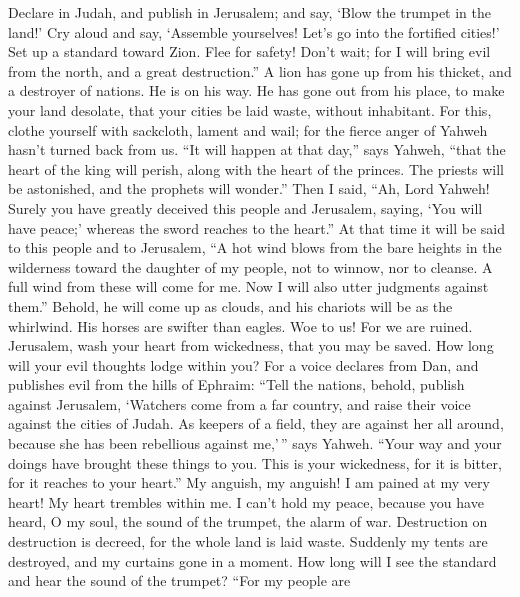  Declare in Judah, and publish in Jerusalem; and say,
`Blow the trumpet in the land!' Cry aloud and say, `Assemble yourselves!
Let's go into the fortified cities!'  Set up a standard
toward Zion. Flee for safety! Don't wait; for I will bring evil from the
north, and a great destruction.''  A lion has gone up from
his thicket, and a destroyer of nations. He is on his way. He has gone
out from his place, to make your land desolate, that your cities be laid
waste, without inhabitant.  For this, clothe yourself with
sackcloth, lament and wail; for the fierce anger of Yahweh hasn't turned
back from us.  ``It will happen at that day,'' says
Yahweh, ``that the heart of the king will perish, along with the heart
of the princes. The priests will be astonished, and the prophets will
wonder.''  Then I said, ``Ah, Lord Yahweh! Surely you
have greatly deceived this people and Jerusalem, saying, `You will have
peace;' whereas the sword reaches to the heart.''  At
that time it will be said to this people and to Jerusalem, ``A hot wind
blows from the bare heights in the wilderness toward the daughter of my
people, not to winnow, nor to cleanse.  A full wind from
these will come for me. Now I will also utter judgments against them.''
 Behold, he will come up as clouds, and his chariots will
be as the whirlwind. His horses are swifter than eagles. Woe to us! For
we are ruined.  Jerusalem, wash your heart from
wickedness, that you may be saved. How long will your evil thoughts
lodge within you?  For a voice declares from Dan, and
publishes evil from the hills of Ephraim:  ``Tell the
nations, behold, publish against Jerusalem, `Watchers come from a far
country, and raise their voice against the cities of Judah.
 As keepers of a field, they are against her all around,
because she has been rebellious against me,'\,'' says Yahweh.
 ``Your way and your doings have brought these things to
you. This is your wickedness, for it is bitter, for it reaches to your
heart.''  My anguish, my anguish! I am pained at my very
heart! My heart trembles within me. I can't hold my peace, because you
have heard, O my soul, the sound of the trumpet, the alarm of war.
 Destruction on destruction is decreed, for the whole
land is laid waste. Suddenly my tents are destroyed, and my curtains
gone in a moment.  How long will I see the standard and
hear the sound of the trumpet?  ``For my people are
